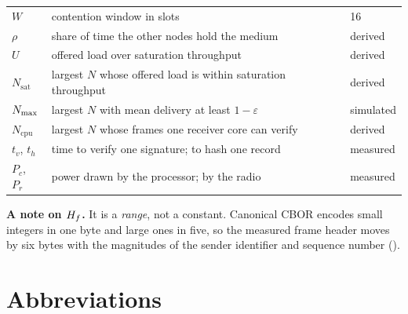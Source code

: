 {\begin{tabularx}{\textwidth}{@{}l Y l@{}}
$W$        & contention window in slots & 16 \\
$\rho$     & share of time the other nodes hold the medium & derived \\
$U$        & offered load over saturation throughput & derived \\
$N_{\mathrm{sat}}$ & largest $N$ whose offered load is within saturation throughput & derived \\
$N_{\max}$    & largest $N$ with mean delivery at least $1-\varepsilon$ & simulated \\
$N_{\mathrm{cpu}}$ & largest $N$ whose frames one receiver core can verify & derived \\
$t_v$, $t_h$ & time to verify one signature; to hash one record & measured \\
$P_c$, $P_r$ & power drawn by the processor; by the radio & measured \\
\bottomrule
\end{tabularx}
}

\vspace{0.6em}
\noindent\textbf{A note on $H_f$.} It is a \emph{range}, not a constant. Canonical CBOR
encodes small integers in one byte and large ones in five, so the measured frame header moves by
six bytes with the magnitudes of the sender identifier and sequence number ().

\section*{Abbreviations}

